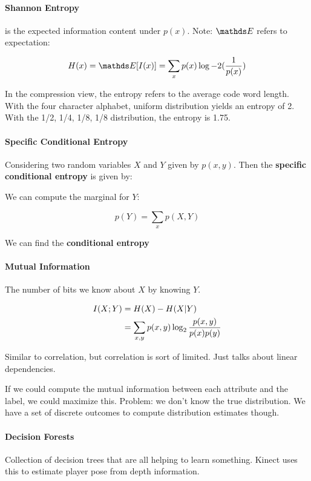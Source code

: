 \paragraph{Shannon Entropy} is the expected information content under $p(x)$. Note: $\bbE$ refers to expectation:

\[
	H(x) = \bbE[I(x)] = \sum_x p(x) \log-2({1 \over p(x)})
\]

In the compression view, the entropy refers to the average code word length. With the four character alphabet, uniform distribution yields an entropy of 2. With the 1/2, 1/4, 1/8, 1/8 distribution, the entropy is 1.75.

\paragraph{Specific Conditional Entropy} Considering two random variables $X$ and $Y$ given by $p(x,y)$. Then the \textbf{specific conditional entropy} is given by:


We can compute the marginal for $Y$:

\[
	p(Y) = \sum_x p(X,Y)
\]

We can find the \textbf{conditional entropy} %


\paragraph{Mutual Information} The number of bits we know about $X$ by knowing $Y$.

\begin{align*}
	I(X;Y) &= H(X) - H(X | Y) \\
	&= \sum_{x,y} p(x,y) \log_2 {p(x,y) \over p(x) p(y)}
\end{align*}

Similar to correlation, but correlation is sort of limited. Just talks about linear dependencies.

If we could compute the mutual information between each attribute and the label, we could maximize this. Problem: we don't know the true distribution. We have a set of discrete outcomes to compute distribution estimates though.

\paragraph{Decision Forests} Collection of decision trees that are all helping to learn something. Kinect uses this to estimate player pose from depth information.
